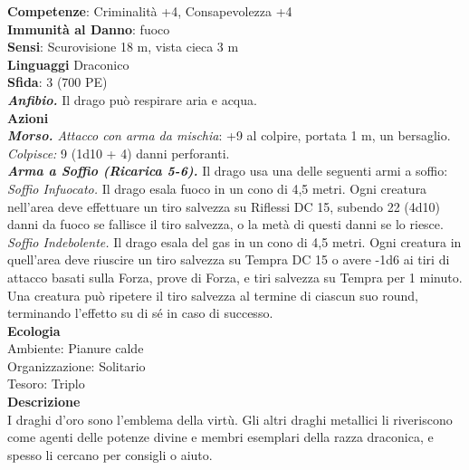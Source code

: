 \begin{multicols}{2}
\textbf{Competenze}: Criminalità +4, Consapevolezza +4\\
\textbf{Immunità al Danno}: fuoco\\
\textbf{Sensi}: Scurovisione 18 m, vista cieca 3 m \\
\textbf{Linguaggi} Draconico\\
\textbf{Sfida}: 3 (700 PE)\smallskip\\
\emph{\textbf{Anfibio.}} Il drago può respirare aria e acqua.\\
\smallskip\textbf{Azioni}\\
\emph{\textbf{Morso.} Attacco con arma da mischia}: +9 al colpire, portata 1 m, un bersaglio.\\
\emph{Colpisce:} 9 (1d10 + 4) danni perforanti.\\
\emph{\textbf{Arma a Soffio (Ricarica 5-6).}} Il drago usa una delle seguenti armi a soffio:\\
\emph{Soffio Infuocato.} Il drago esala fuoco in un cono di 4,5 metri. Ogni creatura nell'area deve effettuare un tiro salvezza su Riflessi DC  15, subendo 22 (4d10) danni da fuoco se fallisce il tiro salvezza, o la metà di questi danni se lo riesce.\\
\emph{Soffio Indebolente.} Il drago esala del gas in un cono di 4,5 metri. Ogni creatura in quell'area deve riuscire un tiro salvezza su Tempra DC  15 o avere -1d6 ai tiri di attacco basati sulla Forza, prove di Forza, e tiri salvezza su Tempra per 1 minuto. Una creatura può ripetere il tiro salvezza al termine di ciascun suo round, terminando l'effetto su di sé in caso di successo.\\
\textbf{Ecologia}\\
Ambiente: Pianure calde\\
Organizzazione: Solitario\\
Tesoro: Triplo\\
\textbf{Descrizione}\\
I draghi d'oro sono l'emblema della virtù. Gli altri draghi metallici li riveriscono come agenti delle potenze divine e membri esemplari della razza draconica, e spesso li cercano per consigli o aiuto.\\


\end{multicols}
